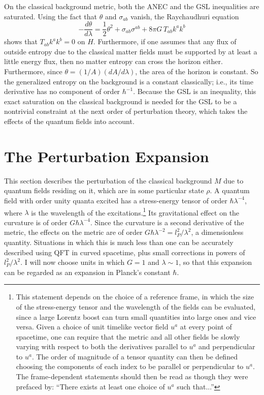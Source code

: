 \documentclass[11pt]{article}
\begin{document}
On the classical background metric, both the ANEC and the GSL inequalities are saturated.  Using the fact that $\theta$ and $\sigma_{ab}$ vanish, the Raychaudhuri equation
\begin{equation}\label{Ray}
-\frac{d\theta}{d\lambda} = \frac{1}{2}\theta^2 
+ \sigma_{ab}\sigma^{ab}
+ 8\pi G\,T_{ab} k^a k^b
\end{equation}
shows that $T_{ab} k^a k^b = 0$ on $H$.  Furthermore, if one assumes that any flux of outside entropy due to the classical matter fields must be supported by at least a little energy flux, then no matter entropy can cross the horizon either.  Furthermore, since $\theta = (1/A)(dA/{d\lambda})$, the area of the horizon is constant.  So the generalized entropy on the background is a constant classically; i.e., its time derivative has no component of order $\hbar^{-1}$.  Because the GSL is an inequality, this exact saturation on the classical background is needed for the GSL to be a nontrivial constraint at the next order of perturbation theory, which takes the effects of the quantum fields into account.

\section{The Perturbation Expansion}\label{pert}

This section describes the perturbation of the classical background $M$ due to quantum fields residing on it, which are in some particular state $\rho$.  A quantum field with order unity quanta excited has a stress-energy tensor of order $\hbar \lambda^{-4}$, where $\lambda$ is the wavelength of the excitations.\footnote{This statement depends on the choice of a reference frame, in which the size of the stress-energy tensor and the wavelength of the fields can be evaluated, since a large Lorentz boost can turn small quantities into large ones and vice versa.  Given a choice of unit timelike vector field $u^a$ at every point of spacetime, one can require that the metric and all other fields be slowly varying with respect to both the derivatives parallel to $u^a$ and perpendicular to $u^a$.  The order of magnitude of a tensor quantity can then be defined choosing the components of each index to be parallel or perpendicular to $u^a$.  The frame-dependent statements should then be read as though they were prefaced by: ``There exists at least one choice of $u^a$ such that...''}
Its gravitational effect on the curvature is of order $G\hbar \lambda^{-4}$.  Since the curvature is a second derivative of the metric, the effects on the metric are of order $G\hbar \lambda^{-2} = {l_P^2}/{\lambda^2}$, a dimensionless quantity.  Situations in which this is much less than one can be accurately described using QFT in curved spacetime, plus small corrections in powers of ${l_P^2}/{\lambda^2}$.  I will now choose units in which $G = 1$ and $\lambda \sim 1$, so that this expansion can be regarded as an expansion in Planck's constant $\hbar$.
\end{document}

